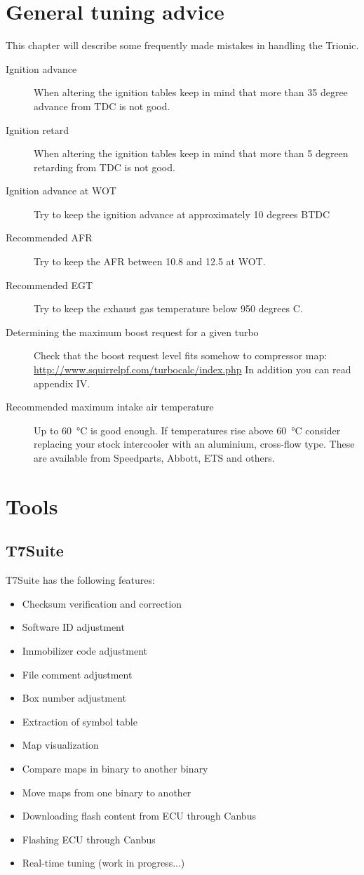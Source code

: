\documentclass[11pt,a4paper]{book}
\begin{document}
\chapter{General tuning advice}
This chapter will describe some frequently made mistakes in handling the Trionic.
\begin{description}
    \item[Ignition advance]
        When altering the ignition tables keep in mind that more than 35 degree advance from TDC is not good.
    \item[Ignition retard]
        When altering the ignition tables keep in mind that more than 5 degreen retarding from TDC is not good.
    \item[Ignition advance at WOT] Try to keep the ignition advance at
        approximately 10 degrees BTDC
    \item[Recommended AFR] Try to keep the AFR between 10.8 and 12.5 at WOT.
    \item[Recommended EGT] Try to keep the exhaust gas temperature below 950
        degrees C.
    \item[Determining the maximum boost request for a given turbo] Check that the boost request level fits somehow to compressor map:
        \url{http://www.squirrelpf.com/turbocalc/index.php}
        In addition you can read appendix IV.
    \item[Recommended maximum intake air temperature] Up to
        \SI{60}{\celsius} is good enough. If temperatures rise above
        \SI{60}{\celsius} consider replacing your stock
        intercooler with an aluminium, cross-flow type. These are available from Speedparts, Abbott, ETS and
        others.
\end{description}

\chapter{Tools}
\section{T7Suite}
T7Suite has the following features:
\begin{itemize}
    \item Checksum verification and correction
    \item Software ID adjustment
    \item Immobilizer code adjustment
    \item File comment adjustment
    \item Box number adjustment
    \item Extraction of symbol table
    \item Map visualization
    \item Compare maps in binary to another binary
    \item Move maps from one binary to another
    \item Downloading flash content from ECU through Canbus
    \item Flashing ECU through Canbus
    \item Real-time tuning (work in progress...)
\end{itemize}
\end{document}

